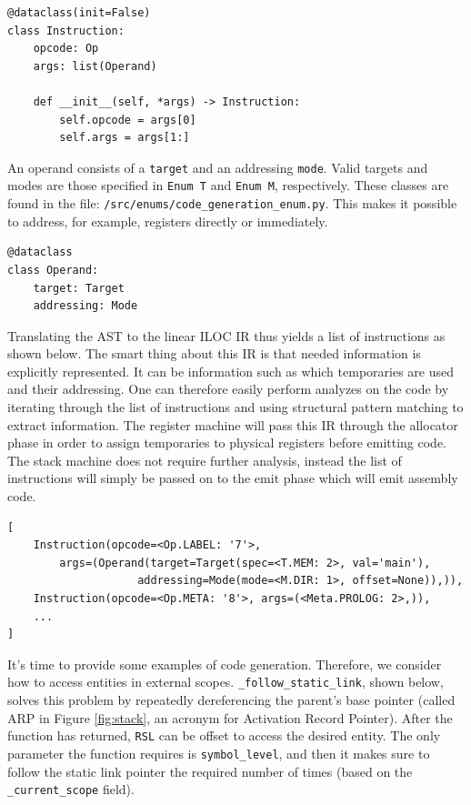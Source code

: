 \begin{verbatim}
@dataclass(init=False)
class Instruction:
    opcode: Op
    args: list(Operand)

    def __init__(self, *args) -> Instruction:
        self.opcode = args[0]
        self.args = args[1:]
\end{verbatim}

An operand consists of a \texttt{target} and an addressing \texttt{mode}. Valid targets and modes are those specified in \texttt{Enum T} and \texttt{Enum M}, respectively. These classes are found in the file: \texttt{/src/enums/code\_generation\_enum.py}. This makes it possible to address, for example, registers directly or immediately.

\begin{verbatim}
@dataclass
class Operand:
    target: Target
    addressing: Mode
\end{verbatim}

Translating the AST to the linear ILOC IR thus yields a list of instructions as shown below. The smart thing about this IR is that needed information is explicitly represented. It can be information such as which temporaries are used and their addressing. One can therefore easily perform analyzes on the code by iterating through the list of instructions and using structural pattern matching to extract information. The register machine will pass this IR through the allocator phase in order to assign temporaries to physical registers before emitting code. The stack machine does not require further analysis, instead the list of instructions will simply be passed on to the emit phase which will emit assembly code.

\begin{verbatim}
[
    Instruction(opcode=<Op.LABEL: '7'>,
        args=(Operand(target=Target(spec=<T.MEM: 2>, val='main'),
                    addressing=Mode(mode=<M.DIR: 1>, offset=None)),)),
    Instruction(opcode=<Op.META: '8'>, args=(<Meta.PROLOG: 2>,)),
    ...
]
\end{verbatim}

It's time to provide some examples of code generation. Therefore, we consider how to access entities in external scopes. \texttt{\_follow\_static\_link}, shown below, solves this problem by repeatedly dereferencing the parent's base pointer (called ARP in Figure \ref{fig:stack}, an acronym for Activation Record Pointer). After the function has returned, \texttt{RSL} can be offset to access the desired entity. The only parameter the function requires is \texttt{symbol\_level}, and then it makes sure to follow the static link pointer the required number of times (based on the \texttt{\_current\_scope} field).

